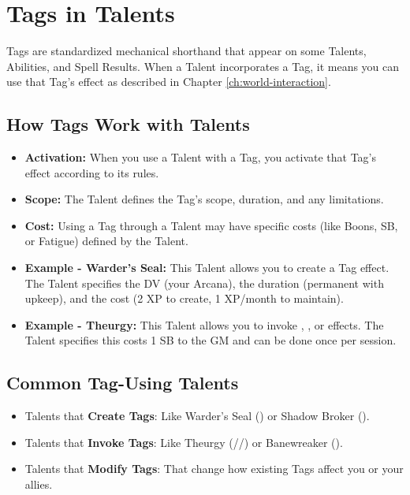 \section{Tags in Talents}

Tags are standardized mechanical shorthand that appear on some Talents, Abilities, and Spell Results. When a Talent incorporates a Tag, it means you can use that Tag's effect as described in Chapter \ref{ch:world-interaction}.

\subsection*{How Tags Work with Talents}
\begin{itemize}
    \item \textbf{Activation:} When you use a Talent with a Tag, you activate that Tag's effect according to its rules.
    \item \textbf{Scope:} The Talent defines the Tag's scope, duration, and any limitations.
    \item \textbf{Cost:} Using a Tag through a Talent may have specific costs (like Boons, SB, or Fatigue) defined by the Talent.
    \item \textbf{Example - Warder's Seal:} This Talent allows you to create a  Tag effect. The Talent specifies the DV (your Arcana), the duration (permanent with upkeep), and the cost (2 XP to create, 1 XP/month to maintain).
    \item \textbf{Example - Theurgy:} This Talent allows you to invoke , , or  effects. The Talent specifies this costs 1 SB to the GM and can be done once per session.
\end{itemize}

\subsection*{Common Tag-Using Talents}
\begin{itemize}
    \item Talents that \textbf{Create Tags}: Like Warder's Seal () or Shadow Broker ().
    \item Talents that \textbf{Invoke Tags}: Like Theurgy (//) or Banewreaker ().
    \item Talents that \textbf{Modify Tags}: That change how existing Tags affect you or your allies.
\end{itemize}

